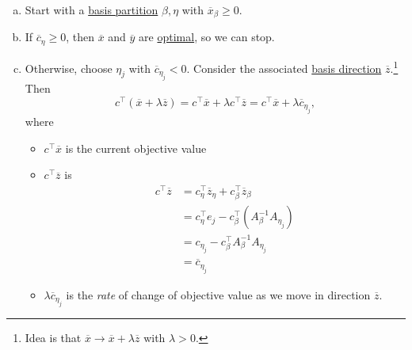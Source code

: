 \begin{enumerate}[(a)]
	\item Start with a \hyperref[def:basic-partition]{basis partition} \(\beta, \eta\) with \(\overline{x}_{\beta}\geq 0\).
	\item If \(\overline{c}_{\eta}\geq 0\), then \(\overline{x}\) and \(\overline{y}\) are \hyperref[def:optimal-solution]{optimal}, so we can stop.
	\item Otherwise, choose \(\eta_j\) with \(\overline{c}_{\eta_j}<0\). Consider the associated \hyperref[def:basic-direction]{basis direction} \(\overline{z}\).\footnote{Idea is that \(\overline{x}\to \overline{x}+\lambda \overline{z}\) with \(\lambda >0\).} Then
	      \[
		      c^{\top}(\overline{x} + \lambda \overline{z}) = c^{\top} \overline{x} + \lambda c^{\top} \overline{z} = c^{\top} \overline{x} + \lambda \overline{c}_{\eta_j},
	      \]
	      where \begin{itemize}
		      \item \(c^{\top} \overline{x}\) is the current objective value
		      \item \(c^{\top}\overline{z}\) is
		            \[
			            \begin{split}
				            c^{\top}\overline{z} &= c_{\eta}^{\top} \overline{z}_{\eta}+c_{\beta}^{\top} \overline{z}_{\beta}\\
				            &=c_{\eta}^{\top}e_{j} - c_{\beta}^{\top}(A^{-1}_{\beta}A_{\eta_j})\\
				            &=c_{\eta_{j}} - c_{\beta}^{\top} A^{-1}_{\beta}A_{\eta_j}\\
				            &= \overline{c}_{\eta_{j}}
			            \end{split}
		            \]
		      \item \(\lambda \overline{c}_{\eta_{j}}\) is the \emph{rate} of change of objective value as we move in direction \(\overline{z}\).
	      \end{itemize}


\end{enumerate}
